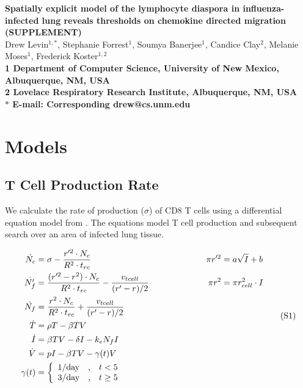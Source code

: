 \documentclass[10pt]{article}
\date{}
\begin{document}
\begin{flushleft}
{\Large
\textbf{Spatially explicit model of the lymphocyte diaspora in influenza-infected lung reveals thresholds on chemokine directed migration (SUPPLEMENT)}
}
\\
Drew Levin$^{1,\ast}$, 
Stephanie Forrest$^{1}$, 
Soumya Banerjee$^{1}$,
Candice Clay$^{2}$, 
Melanie Moses$^{1}$, 
Frederick Koster$^{1,2}$
\\
\bf{1} Department of Computer Science, University of New Mexico, Albuquerque, NM, USA
\\
\bf{2} Lovelace Respiratory Research Institute, Albuquerque, NM, USA
\\
$\ast$ E-mail: Corresponding drew@cs.unm.edu
\end{flushleft}


\section{Models}

\subsection{T Cell Production Rate}

We calculate the rate of production ($\sigma$) of CD8 T cells using a differential equation model from \cite{Miao2010}.  The equations model T cell production and subsequent search over an area of infected lung tissue.

{\footnotesize
\begin{equation*}
\label{EqS1}
\begin{aligned}
\dot{N_{c}} &= \sigma - \frac{r'^{2} \cdot N_{c}}{R^{2} \cdot t_{rc}}    & \pi r'^{2} &= a \sqrt{I} + b \\
\dot{N'_{f}} &= \frac{(r'^{2} - r^{2}) \cdot N_{c}}{R^{2} \cdot t_{rc}} - \frac{v_{tcell}}{(r' - r) / 2} \hspace*{2cm}  & \pi r^{2} &= \pi r_{cell}^{2} \cdot I \\
\dot{N_{f}} &= \frac{r^{2} \cdot N_{c}}{R^{2} \cdot t_{rc}} + \frac{v_{tcell}}{(r' - r) / 2} \\
\dot{T} &= \rho T -\beta TV \\
\dot{I} &= \beta TV - \delta I - k_{e} N_{f} I \\
\dot{V} &= pI - \beta TV - \gamma (t) V \\
\gamma (t) &= \left\{ \begin{array}{rcl}
	1/\mbox{day} & \mbox{,}  & t < 5  \\
	3/\mbox{day} & \mbox{,} & t \geq 5  
	\end{array}\right. \\
\end{aligned}
\tag{S1}
\end{equation*}
}
\vspace{.05in}
\end{document}
